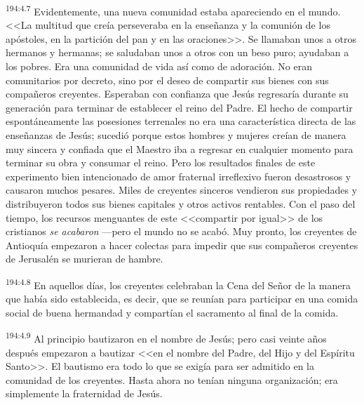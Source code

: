 \par 
\textsuperscript{194:4.7} Evidentemente, una nueva comunidad estaba apareciendo en el mundo. <<La multitud que creía perseveraba en la enseñanza y la comunión de los apóstoles, en la partición del pan y en las oraciones>>. Se llamaban unos a otros hermanos y hermanas; se saludaban unos a otros con un beso puro; ayudaban a los pobres. Era una comunidad de vida así como de adoración. No eran comunitarios por decreto, sino por el deseo de compartir sus bienes con sus compañeros creyentes. Esperaban con confianza que Jesús regresaría durante su generación para terminar de establecer el reino del Padre. El hecho de compartir espontáneamente las posesiones terrenales no era una característica directa de las enseñanzas de Jesús; sucedió porque estos hombres y mujeres creían de manera muy sincera y confiada que el Maestro iba a regresar en cualquier momento para terminar su obra y consumar el reino. Pero los resultados finales de este experimento bien intencionado de amor fraternal irreflexivo fueron desastrosos y causaron muchos pesares. Miles de creyentes sinceros vendieron sus propiedades y distribuyeron todos sus bienes capitales y otros activos rentables. Con el paso del tiempo, los recursos menguantes de este <<compartir por igual>> de los cristianos \textit{se acabaron} ---pero el mundo no se acabó. Muy pronto, los creyentes de Antioquía empezaron a hacer colectas para impedir que sus compañeros creyentes de Jerusalén se murieran de hambre.

\par 
\textsuperscript{194:4.8} En aquellos días, los creyentes celebraban la Cena del Señor de la manera que había sido establecida, es decir, que se reunían para participar en una comida social de buena hermandad y compartían el sacramento al final de la comida.

\par 
\textsuperscript{194:4.9} Al principio bautizaron en el nombre de Jesús; pero casi veinte años después empezaron a bautizar <<en el nombre del Padre, del Hijo y del Espíritu Santo>>. El bautismo era todo lo que se exigía para ser admitido en la comunidad de los creyentes. Hasta ahora no tenían ninguna organización; era simplemente la fraternidad de Jesús.

